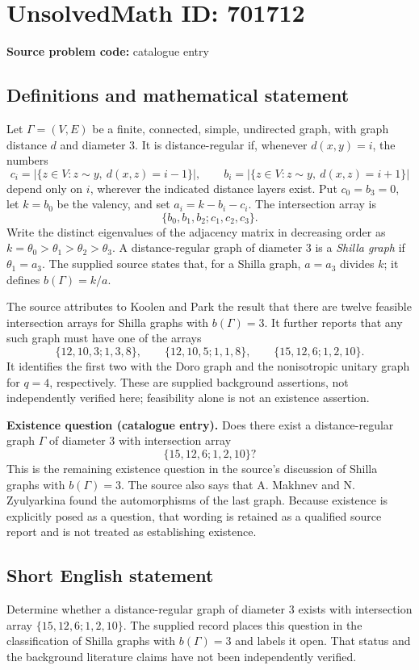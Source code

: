 \documentclass[11pt]{article}
\begin{document}
\section*{UnsolvedMath ID: 701712}
\textbf{Source problem code:} catalogue entry
\subsection{Definitions and mathematical statement}
Let \(\Gamma=(V,E)\) be a finite, connected, simple, undirected graph, with graph distance \(d\) and diameter \(3\). It is distance-regular if, whenever \(d(x,y)=i\), the numbers
\[
 c_i=\bigl|\{z\in V:z\sim y,\ d(x,z)=i-1\}\bigr|,\qquad
 b_i=\bigl|\{z\in V:z\sim y,\ d(x,z)=i+1\}\bigr|
\]
depend only on \(i\), wherever the indicated distance layers exist. Put \(c_0=b_3=0\), let \(k=b_0\) be the valency, and set \(a_i=k-b_i-c_i\). The intersection array is
\[
\{b_0,b_1,b_2;c_1,c_2,c_3\}.
\]
Write the distinct eigenvalues of the adjacency matrix in decreasing order as \(k=\theta_0>\theta_1>\theta_2>\theta_3\). A distance-regular graph of diameter \(3\) is a \emph{Shilla graph} if \(\theta_1=a_3\). The supplied source states that, for a Shilla graph, \(a=a_3\) divides \(k\); it defines \(b(\Gamma)=k/a\).

The source attributes to Koolen and Park the result that there are twelve feasible intersection arrays for Shilla graphs with \(b(\Gamma)=3\). It further reports that any such graph must have one of the arrays
\[
\{12,10,3;1,3,8\},\qquad
\{12,10,5;1,1,8\},\qquad
\{15,12,6;1,2,10\}.
\]
It identifies the first two with the Doro graph and the nonisotropic unitary graph for \(q=4\), respectively. These are supplied background assertions, not independently verified here; feasibility alone is not an existence assertion.

\textbf{Existence question (catalogue entry).} Does there exist a distance-regular graph \(\Gamma\) of diameter \(3\) with intersection array
\[
\{15,12,6;1,2,10\}?
\]
This is the remaining existence question in the source's discussion of Shilla graphs with \(b(\Gamma)=3\). The source also says that A. Makhnev and N. Zyulyarkina found the automorphisms of the last graph. Because existence is explicitly posed as a question, that wording is retained as a qualified source report and is not treated as establishing existence.
\subsection{Short English statement}
Determine whether a distance-regular graph of diameter \(3\) exists with intersection array \(\{15,12,6;1,2,10\}\). The supplied record places this question in the classification of Shilla graphs with \(b(\Gamma)=3\) and labels it open. That status and the background literature claims have not been independently verified.
\end{document}

